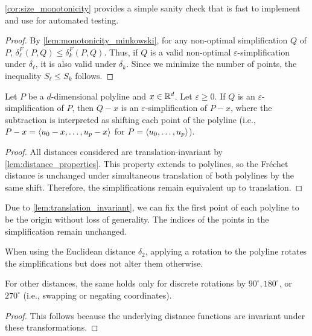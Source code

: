 \cref{cor:size_monotonicity} provides a simple sanity check that is fast to implement and use for automated testing.

\begin{proof}
	By \cref{lem:monotonicity_minkowski}, for any non-optimal simplification \(Q\) of \(P\), \(\delta_\ell^F(P, Q) \leq \delta_k^F(P, Q)\). Thus, if \(Q\) is a valid non-optimal \(\varepsilon\)-simplification under \(\delta_\ell\), it is also valid under \(\delta_k\). Since we minimize the number of points, the inequality \(S_\ell \leq S_k\) follows.
\end{proof}

\begin{lemma}\label{lem:translation_invariant}
	Let \(P\) be a \(d\)-dimensional polyline and \(x \in \mathbb{R}^d\). Let \(\varepsilon \geq 0\). If \(Q\) is an \(\varepsilon\)-simplification of \(P\), then \(Q-x\) is an \(\varepsilon\)-simplification of \(P-x\), where the subtraction is interpreted as shifting each point of the polyline (i.e., \(P-x = \left\langle u_0 - x, \dots, u_p - x\right\rangle\) for \(P = \left\langle u_0,\dots, u_p\right\rangle\)).
\end{lemma}

\begin{proof}
	All distances considered are translation-invariant by \cref{lem:distance_properties}. This property extends to polylines, so the Fréchet distance is unchanged under simultaneous translation of both polylines by the same shift. Therefore, the simplifications remain equivalent up to translation.
\end{proof}

Due to \cref{lem:translation_invariant}, we can fix the first point of each polyline to be the origin without loss of generality. The indices of the points in the simplification remain unchanged.

\begin{corollary}\label{cor:rot_inv}
  When using the Euclidean distance \(\delta_2\), applying a rotation to the polyline rotates the simplifications but does not alter them otherwise.

	For other distances, the same holds only for discrete rotations by \(90^\circ, 180^\circ\), or \(270^\circ\) (i.e., swapping or negating coordinates).
\end{corollary}

\begin{proof}
	This follows because the underlying distance functions are invariant under these transformations.
\end{proof}

